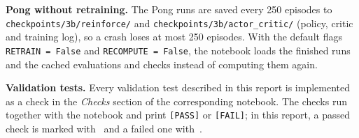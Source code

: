 \begin{sloppypar}
\textbf{Pong without retraining.} The Pong runs are saved every 250 episodes to \texttt{checkpoints/3b/reinforce/} and \texttt{checkpoints/3b/actor\_critic/} (policy, critic and training log), so a crash loses at most 250 episodes. With the default flags \texttt{RETRAIN = False} and \texttt{RECOMPUTE = False}, the notebook loads the finished runs and the cached evaluations and checks instead of computing them again.
\end{sloppypar}

\begin{notebox}
\textbf{Validation tests.} Every validation test described in this report is implemented as a check in the \emph{Checks} section of the corresponding notebook. The checks run together with the notebook and print \texttt{[PASS]} or \texttt{[FAIL]}; in this report, a passed check is marked with~\pass{} and a failed one with~\fail.
\end{notebox}
